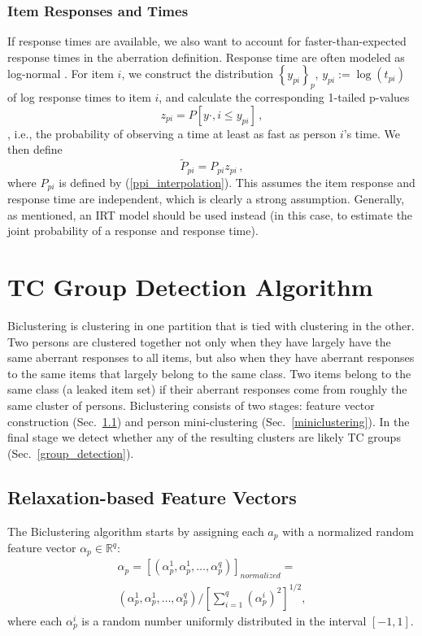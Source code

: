 \documentclass{article}
\newcommand{\R}{\mathbb{R}}
\begin{document}
\subsubsection{Item Responses and Times}
If response times are available, we also want to account for faster-than-expected response times in the aberration definition. Response time are often modeled as log-normal \cite{response_time}. For item $i$, we construct the distribution $\left\{y_{pi}\right\}_p$, $y_{pi} := \log(t_{pi})$ of log response times to item $i$, and calculate the corresponding 1-tailed p-values
$$ z_{pi} = P[y{\cdot,i} \leq y_{pi}]\,, $$,
i.e., the probability of observing a time at least as fast as person $i$'s time. We then define
\begin{equation}
	\tilde{P}_{pi} =  P_{pi} z_{pi}\,,
	\label{ppi_interpolation_time}
\end{equation}
where $P_{pi}$ is defined by (\ref{ppi_interpolation}). This assumes the item response and response time are independent, which is clearly a strong assumption. Generally, as mentioned, an IRT model should be used instead (in this case, to estimate the joint probability of a response and response time).

\section{TC Group Detection Algorithm}
\label{biclustering}
Biclustering is clustering in one partition that is tied with clustering in the other. Two persons are clustered together not only when they have largely have the same aberrant responses to all items, but also when they have aberrant responses to the same items that largely belong to the same class. Two items belong to the same class (a leaked item set) if their aberrant responses come from roughly the same cluster of persons. Biclustering consists of two stages: feature vector construction (Sec.~\ref{feature}) and person mini-clustering (Sec.~\ref{miniclustering}). In the final stage we detect whether any of the resulting clusters are likely TC groups (Sec.~\ref{group_detection}). 

\subsection{Relaxation-based Feature Vectors}
\label{feature}
The Biclustering algorithm starts by assigning each $a_p$ with a normalized random feature vector $\alpha_p \in \R^q$:
\begin{equation}
\begin{split}
  \alpha_p = \left[ (\alpha_p^1,\alpha_p^1,\ldots,\alpha_p^q) \right]_{normalized} =  \\
  (\alpha_p^1,\alpha_p^1,\ldots,\alpha_p^q) /
  \left[ \sum_{i=1}^q (\alpha_p^i)^2 \right]^{1/2},
\end{split}
\end{equation}
where each $\alpha_p^i$ is a random number uniformly distributed in the interval $[-1,1]$. 
\end{document}
